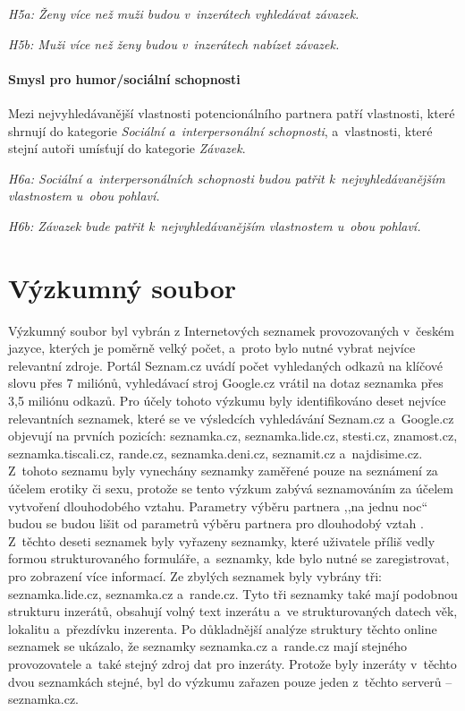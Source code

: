 \documentclass[a4paper, 12pt, notitlepage, oneside, numbers=noenddot]{report}
\begin{document}
\emph{H5a: Ženy více než muži budou v~inzerátech vyhledávat závazek.}

\emph{H5b: Muži více než ženy budou v~inzerátech nabízet závazek.}

\paragraph{Smysl pro humor/sociální schopnosti}

Mezi nejvyhledávanější vlastnosti potencionál\-ního partnera patří
vlastnosti, které \citet{BarrettDunbarLycett2007} shrnují do kategorie
\emph{Sociální a~interpersonální schopnosti}, a~vlastnosti, které
stejní autoři umísťují do kategorie \emph{Závazek}.

\emph{H6a: Sociální a~interpersonálních schopnosti budou patřit
  k~nejvyhledávanějším vlastnostem u~obou pohlaví.}

\emph{H6b: Závazek bude patřit k~nejvyhledávanějším vlastnostem u~obou
  pohlaví.}

\section{Výzkumný soubor}
Výzkumný soubor byl vybrán z Internetových seznamek provozovaných
v~českém jazyce, kterých je poměrně velký počet, a~proto bylo nutné
vybrat nejvíce relevantní zdroje.  Portál Seznam.cz uvádí počet
vyhledaných odkazů na klíčové slovu přes 7 miliónů, vyhledávací stroj
Google.cz vrátil na dotaz seznamka přes 3,5 miliónu odkazů.  Pro účely
tohoto výzkumu byly identifikováno deset nejvíce relevantních
seznamek, které se ve výsledcích vyhledávání Seznam.cz a~Google.cz
objevují na prvních pozicích: seznamka.cz, seznamka.lide.cz,
stesti.cz, znamost.cz, seznamka.tiscali.cz, rande.cz,
seznamka.deni.cz, seznamit.cz a~najdisime.cz.  Z~tohoto seznamu byly
vynechány seznamky zaměřené pouze na seznámení za účelem erotiky či
sexu, protože se tento výzkum zabývá seznamováním za účelem vytvoření
dlouhodobého vztahu.  Parametry výběru partnera ,,na jednu noc`` budou
se budou lišit od parametrů výběru partnera pro dlouhodobý vztah
\citep{Buss2007}.  Z~těchto deseti seznamek byly vyřazeny seznamky,
které uživatele příliš vedly formou strukturovaného formuláře,
a~seznamky, kde bylo nutné se zaregistrovat, pro zobrazení více
informací. Ze zbylých seznamek byly vybrány tři: seznamka.lide.cz,
seznamka.cz a~rande.cz.  Tyto tři seznamky také mají podobnou
strukturu inzerátů, obsahují volný text inzerátu a~ve strukturovaných
datech věk, lokalitu a~přezdívku inzerenta.  Po důkladnější analýze
struktury těchto online seznamek se ukázalo, že seznamky seznamka.cz
a~rande.cz mají stejného provozovatele a~také stejný zdroj dat pro
inzeráty.  Protože byly inzeráty v~těchto dvou seznamkách stejné, byl
do výzkumu zařazen pouze jeden z~těchto serverů -- seznamka.cz.
\end{document}
